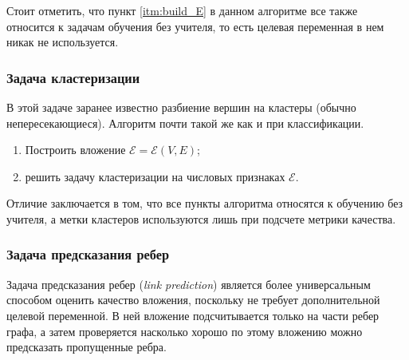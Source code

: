 \documentclass[12pt,a4paper]{extarticle}
\newcommand{\E}{\mathcal{E}}
\begin{document}
    Стоит отметить, что пункт \ref{itm:build_E} в данном алгоритме все также относится к задачам обучения без учителя, то есть целевая переменная в нем никак не используется.
    
    \subsubsection{Задача кластеризации}
    
    В этой задаче заранее известно разбиение вершин на кластеры (обычно непересекающиеся). Алгоритм почти такой же как и при классификации.
    
    \begin{enumerate}
        \item Построить вложение $\E = \E(V, E)$;
        \item решить задачу кластеризации на числовых признаках $\E$.
    \end{enumerate}
    
    Отличие заключается в том, что все пункты алгоритма относятся к обучению без учителя, а метки кластеров используются лишь при подсчете метрики качества.
    
    \subsubsection{Задача предсказания ребер}
    
    Задача предсказания ребер (\textit{link prediction}) является более универсальным способом оценить качество вложения, поскольку не требует дополнительной целевой переменной. В ней вложение подсчитывается только на части ребер графа, а затем проверяется насколько хорошо по этому вложению можно предсказать пропущенные ребра.
    
\end{document}
